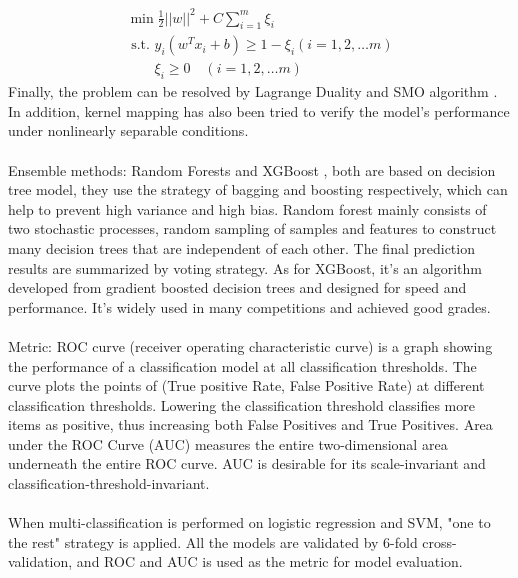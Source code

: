 \documentclass[12pt,a4paper]{article}
\begin{document}
\begin{displaymath}
\begin{array} 
    { c } { \min \frac { 1 } { 2 } | | w | | ^ { 2 } + C \sum _ { i = 1 } ^ { m } \xi _ { i } } \\ { \text { s.t. } y _ { i } \left( w ^ { T } x _ { i } + b \right) \geq 1 - \xi _ { i }  ( i = 1,2 , \ldots m ) } \\ { \qquad \xi _ { i } \geq 0 \quad ( i = 1,2 , \ldots m ) } 
\end{array}
\end{displaymath}
Finally, the problem can be resolved by Lagrange Duality and SMO algorithm \citep{Platt98sequentialminimal}. In addition, kernel mapping has also been tried to verify the model's performance under nonlinearly separable conditions.
\\
\\
Ensemble methods: Random Forests and XGBoost \citep{chen2016xgboost}, both are based on decision tree model, they use the strategy of bagging and boosting respectively, which can help to prevent high variance and high bias. Random forest mainly consists of two stochastic processes, random sampling of samples and features to construct many decision trees that are independent of each other. The final prediction results are summarized by voting strategy. As for XGBoost, it's an algorithm developed from gradient boosted decision trees and designed for speed and performance. It's widely used in many competitions and achieved good grades.
\\
\\
Metric: ROC curve (receiver operating characteristic curve) is a graph showing the performance of a classification model at all classification thresholds. The curve plots the points of (True positive Rate, False Positive Rate) at different classification thresholds. Lowering the classification threshold classifies more items as positive, thus increasing both False Positives and True Positives. Area under the ROC Curve (AUC) measures the entire two-dimensional area underneath the entire ROC curve. AUC is desirable for its scale-invariant and classification-threshold-invariant.
\\
\\
When multi-classification is performed on logistic regression and SVM, "one to the rest" strategy is applied. All the models are validated by 6-fold cross-validation, and ROC and AUC is used as the metric for model evaluation.
\end{document}
